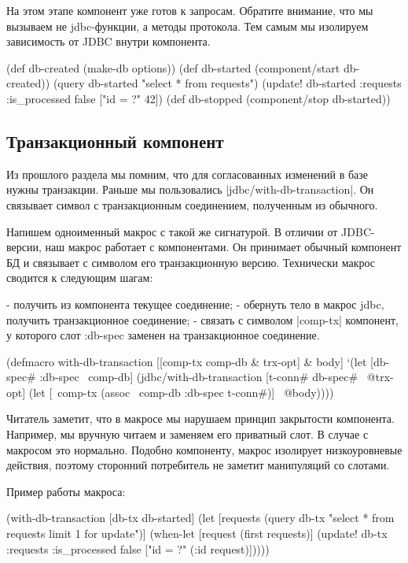 На этом этапе компонент уже готов к запросам. Обратите внимание, что мы вызываем
не jdbc-функции, а методы протокола. Тем самым мы изолируем зависимость от JDBC
внутри компонента.

\begin{code}
(def db-created (make-db options))
(def db-started (component/start db-created))
(query db-started "select * from requests")
(update! db-started :requests {:is_processed false} ["id = ?" 42])
(def db-stopped (component/stop db-started))
\end{code}

\subsection{Транзакционный компонент}

Из прошлого раздела мы помним, что для согласованных изменений в базе нужны
транзакции. Раньше мы пользовались \spverb|jdbc/with-db-transaction|. Он связывает
символ с транзакционным соединением, полученным из обычного.

Напишем одноименный макрос с такой же сигнатурой. В отличии от JDBC-версии, наш
макрос работает с компонентами. Он принимает обычный компонент БД и связывает с
символом его транзакционную версию. Технически макрос сводится к следующим
шагам:

- получить из компонента текущее соединение;
- обернуть тело в макрос jdbc, получить транзакционное соединение;
- связать с символом \spverb|comp-tx| компонент, у которого слот :db-spec заменен на
  транзакционное соединение.

\begin{code}
(defmacro with-db-transaction
  [[comp-tx comp-db & trx-opt] & body]
  `(let [{db-spec# :db-spec} ~comp-db]
     (jdbc/with-db-transaction
       [t-conn# db-spec# ~@trx-opt]
       (let [~comp-tx (assoc ~comp-db :db-spec t-conn#)]
         ~@body))))
\end{code}

Читатель заметит, что в макросе мы нарушаем принцип закрытости
компонента. Например, мы вручную читаем и заменяем его приватный слот. В случае
с макросом это нормально. Подобно компоненту, макрос изолирует низкоуровневые
действия, поэтому сторонний потребитель не заметит манипуляций со слотами.

Пример работы макроса:

\begin{code}
(with-db-transaction
  [db-tx db-started]
  (let [requests (query db-tx "select * from requests limit 1 for update")]
    (when-let [request (first requests)]
      (update! db-tx :requests {:is_processed false} ["id = ?" (:id request)]))))
\end{code}

